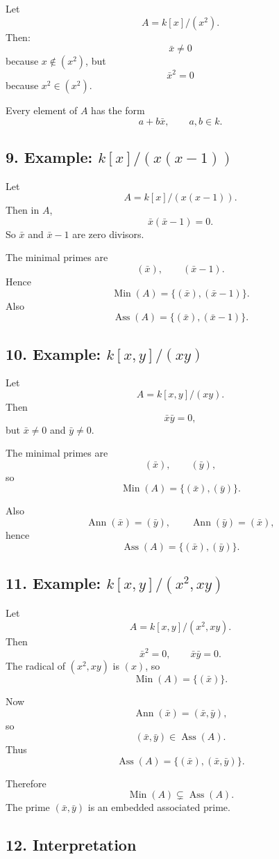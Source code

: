 \documentclass[12pt,a4paper,oneside]{report}
\DeclareMathOperator{\Ass}{Ass}
\DeclareMathOperator{\Ann}{Ann}
\DeclareMathOperator{\Min}{Min}
\theoremstyle{notespace}
\begin{document}
	Let
	\[
	A=k[x]/(x^2).
	\]
	Then:
	\[
	\bar x\neq0
	\]
	because \(x\notin(x^2)\), but
	\[
	\bar x^2=0
	\]
	because \(x^2\in(x^2)\).
	
	Every element of \(A\) has the form
	\[
	a+b\bar x,\qquad a,b\in k.
	\]
	
	\subsection{9. Example: \(k[x]/(x(x-1))\)}
	
	Let
	\[
	A=k[x]/(x(x-1)).
	\]
	Then in \(A\),
	\[
	\bar x(\bar x-1)=0.
	\]
	So \(\bar x\) and \(\bar x-1\) are zero divisors.
	
	The minimal primes are
	\[
	(\bar x),\qquad (\bar x-1).
	\]
	Hence
	\[
	\Min(A)=\{(\bar x),(\bar x-1)\}.
	\]
	Also
	\[
	\Ass(A)=\{(\bar x),(\bar x-1)\}.
	\]
	
	\subsection{10. Example: \(k[x,y]/(xy)\)}
	
	Let
	\[
	A=k[x,y]/(xy).
	\]
	Then
	\[
	\bar x\bar y=0,
	\]
	but \(\bar x\neq0\) and \(\bar y\neq0\).
	
	The minimal primes are
	\[
	(\bar x),\qquad (\bar y),
	\]
	so
	\[
	\Min(A)=\{(\bar x),(\bar y)\}.
	\]
	
	Also
	\[
	\Ann(\bar x)=(\bar y),\qquad \Ann(\bar y)=(\bar x),
	\]
	hence
	\[
	\Ass(A)=\{(\bar x),(\bar y)\}.
	\]
	
	\subsection{11. Example: \(k[x,y]/(x^2,xy)\)}
	
	Let
	\[
	A=k[x,y]/(x^2,xy).
	\]
	Then
	\[
	\bar x^2=0,\qquad \bar x\bar y=0.
	\]
	The radical of \((x^2,xy)\) is \((x)\), so
	\[
	\Min(A)=\{(\bar x)\}.
	\]
	
	Now
	\[
	\Ann(\bar x)=(\bar x,\bar y),
	\]
	so
	\[
	(\bar x,\bar y)\in\Ass(A).
	\]
	Thus
	\[
	\Ass(A)=\{(\bar x),(\bar x,\bar y)\}.
	\]
	
	Therefore
	\[
	\Min(A)\subsetneq \Ass(A).
	\]
	The prime \((\bar x,\bar y)\) is an embedded associated prime.
	
	\subsection{12. Interpretation}
	
\end{document}
